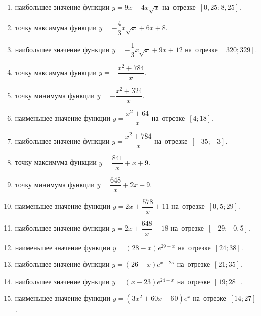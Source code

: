 \documentclass[a4paper,10pt]{article}
\begin{document}
\begin{enumerate}
\item {} наибольшее значение функции $y=9x -4x\sqrt{x}$ на~отрезке~$\left[0,25;8,25\right]$.

\item {} точку максимума функции $y=-\dfrac{4}{3}x\sqrt{x} +6x+8$.

\item {} наибольшее значение функции $y=-\dfrac{1}{3}x\sqrt{x} +9x+12$ на~отрезке~$\left[320;329\right]$.

\item {} точку максимума функции $y=-\dfrac{x^2 +784}{x}$.

\item {} точку минимума функции $y=-\dfrac{x^2 +324}{x}$.

\item {} наименьшее значение функции $y=\dfrac{x^2 +64}{x}$ на~отрезке~$\left[4;18\right]$.

\item {} наибольшее значение функции $y=\dfrac{x^2 +784}{x}$ на~отрезке~$\left[-35;-3\right]$.

\item {} точку максимума функции $y=\dfrac{841}{x} +x+9$.

\item {} точку минимума функции $y=\dfrac{648}{x} +2x+9$.

\item {} наименьшее значение функции $y=2x+\dfrac{578}{x} +11$ на~отрезке~$\left[0,5;29\right]$.

\item {} наибольшее значение функции $y=2x+\dfrac{648}{x} +18$ на~отрезке~$\left[-29;-0,5\right]$.

\item {} наименьшее значение функции $y=\left(28-x\right)e^{29-x}$ на~отрезке~$\left[24;38\right]$.

\item {} наибольшее значение функции $y=\left(26-x\right)e^{x-25}$ на~отрезке~$\left[21;35\right]$.

\item {} наибольшее значение функции $y=\left(x-23\right)e^{24-x}$ на~отрезке~$\left[19;28\right]$.

\item {} наименьшее значение функции $y=\left(3x^2 +60x -60\right)e^{x }$ на~отрезке~$\left[14;27\right]$.


\end{enumerate}
\end{document}

